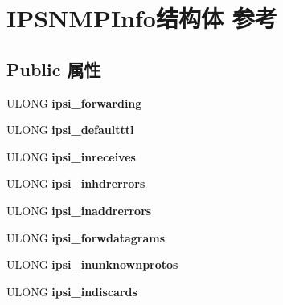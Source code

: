 \hypertarget{struct_i_p_s_n_m_p_info}{}\section{I\+P\+S\+N\+M\+P\+Info结构体 参考}
\label{struct_i_p_s_n_m_p_info}
\subsection*{Public 属性}
\begin{DoxyCompactItemize}
\item 
\mbox{\label{struct_i_p_s_n_m_p_info_ab623feb3ffff7c20d43624d4810b9df9}} 
U\+L\+O\+NG {\bfseries ipsi\+\_\+forwarding}
\item 
\mbox{\label{struct_i_p_s_n_m_p_info_a2222d59575e9628fae571deea18d0ec8}} 
U\+L\+O\+NG {\bfseries ipsi\+\_\+defaultttl}
\item 
\mbox{\label{struct_i_p_s_n_m_p_info_aa9d19501d740af0b6434f26f7081f647}} 
U\+L\+O\+NG {\bfseries ipsi\+\_\+inreceives}
\item 
\mbox{\label{struct_i_p_s_n_m_p_info_afa15d329d597bbc8ca01a620c2cbbfea}} 
U\+L\+O\+NG {\bfseries ipsi\+\_\+inhdrerrors}
\item 
\mbox{\label{struct_i_p_s_n_m_p_info_acdd510b36e080fa8c383a2cbc93f3f14}} 
U\+L\+O\+NG {\bfseries ipsi\+\_\+inaddrerrors}
\item 
\mbox{\label{struct_i_p_s_n_m_p_info_a4314c2021157f62ec1b209e6f3f3915f}} 
U\+L\+O\+NG {\bfseries ipsi\+\_\+forwdatagrams}
\item 
\mbox{\label{struct_i_p_s_n_m_p_info_acb201aeea3cb6b59ed6ca7f64141b728}} 
U\+L\+O\+NG {\bfseries ipsi\+\_\+inunknownprotos}
\item 
\mbox{\label{struct_i_p_s_n_m_p_info_a26290012d0334d5c1baa9b033e7ee9f5}} 
U\+L\+O\+NG {\bfseries ipsi\+\_\+indiscards}
\item 
\mbox{\label{struct_i_p_s_n_m_p_info_a03c76e146930cb42c4ae3d21e8defd7f}} 

\end{DoxyCompactItemize}
